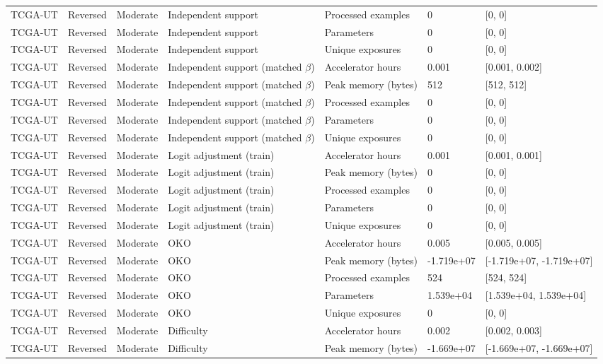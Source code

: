 \begin{longtable}{lllllll}
TCGA-UT & Reversed & Moderate & Independent support & Processed examples & 0 & [0, 0] \\
TCGA-UT & Reversed & Moderate & Independent support & Parameters & 0 & [0, 0] \\
TCGA-UT & Reversed & Moderate & Independent support & Unique exposures & 0 & [0, 0] \\
TCGA-UT & Reversed & Moderate & Independent support (matched $\beta$) & Accelerator hours & 0.001 & [0.001, 0.002] \\
TCGA-UT & Reversed & Moderate & Independent support (matched $\beta$) & Peak memory (bytes) & 512 & [512, 512] \\
TCGA-UT & Reversed & Moderate & Independent support (matched $\beta$) & Processed examples & 0 & [0, 0] \\
TCGA-UT & Reversed & Moderate & Independent support (matched $\beta$) & Parameters & 0 & [0, 0] \\
TCGA-UT & Reversed & Moderate & Independent support (matched $\beta$) & Unique exposures & 0 & [0, 0] \\
TCGA-UT & Reversed & Moderate & Logit adjustment (train) & Accelerator hours & 0.001 & [0.001, 0.001] \\
TCGA-UT & Reversed & Moderate & Logit adjustment (train) & Peak memory (bytes) & 0 & [0, 0] \\
TCGA-UT & Reversed & Moderate & Logit adjustment (train) & Processed examples & 0 & [0, 0] \\
TCGA-UT & Reversed & Moderate & Logit adjustment (train) & Parameters & 0 & [0, 0] \\
TCGA-UT & Reversed & Moderate & Logit adjustment (train) & Unique exposures & 0 & [0, 0] \\
TCGA-UT & Reversed & Moderate & OKO & Accelerator hours & 0.005 & [0.005, 0.005] \\
TCGA-UT & Reversed & Moderate & OKO & Peak memory (bytes) & -1.719e+07 & [-1.719e+07, -1.719e+07] \\
TCGA-UT & Reversed & Moderate & OKO & Processed examples & 524 & [524, 524] \\
TCGA-UT & Reversed & Moderate & OKO & Parameters & 1.539e+04 & [1.539e+04, 1.539e+04] \\
TCGA-UT & Reversed & Moderate & OKO & Unique exposures & 0 & [0, 0] \\
TCGA-UT & Reversed & Moderate & Difficulty & Accelerator hours & 0.002 & [0.002, 0.003] \\
TCGA-UT & Reversed & Moderate & Difficulty & Peak memory (bytes) & -1.669e+07 & [-1.669e+07, -1.669e+07] \\

\end{longtable}
